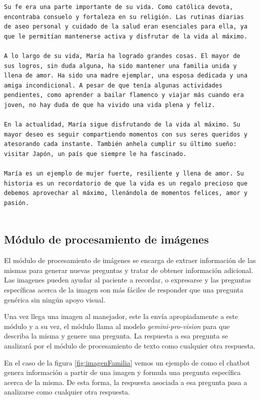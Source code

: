 \begin{verbatim}
Su fe era una parte importante de su vida. Como católica devota,  
encontraba consuelo y fortaleza en su religión. Las rutinas diarias  
de aseo personal y cuidado de la salud eran esenciales para ella, ya  
que le permitían mantenerse activa y disfrutar de la vida al máximo.  

A lo largo de su vida, María ha logrado grandes cosas. El mayor de  
sus logros, sin duda alguna, ha sido mantener una familia unida y  
llena de amor. Ha sido una madre ejemplar, una esposa dedicada y una  
amiga incondicional. A pesar de que tenía algunas actividades  
pendientes, como aprender a bailar flamenco y viajar más cuando era  
joven, no hay duda de que ha vivido una vida plena y feliz.  

En la actualidad, María sigue disfrutando de la vida al máximo. Su  
mayor deseo es seguir compartiendo momentos con sus seres queridos y  
atesorando cada instante. También anhela cumplir su último sueño:  
visitar Japón, un país que siempre le ha fascinado.  

María es un ejemplo de mujer fuerte, resiliente y llena de amor. Su  
historia es un recordatorio de que la vida es un regalo precioso que  
debemos aprovechar al máximo, llenándola de momentos felices, amor y  
pasión.
	
\end{verbatim}

\subsection{Módulo de procesamiento de imágenes}
\label{procesamientoimagenes}
El módulo de procesamiento de imágenes se encarga de extraer información de las mismas para generar nuevas preguntas y tratar de obtener información adicional. Las imagenes pueden ayudar al paciente a recordar, o expresarse y las preguntas específicas acerca de la imagen son más fáciles de responder que una pregunta genérica sin ningún apoyo visual. 

Una vez llega una imagen al manejador, este la envía apropiadamente a este módulo y a su vez, el módulo llama al modelo  \textit{gemini-pro-vision} para que describa la misma y genere una pregunta. La respuesta a esa pregunta se analizará por el módulo de procesamiento de texto como cualquier otra respuesta. 

En el caso de la figura \ref{fig:imagenFamilia} vemos un ejemplo de como el chatbot genera información a partir de una imagen y formula una pregunta específica acerca de la misma. De esta forma, la respuesta asociada a esa pregunta pasa a analizarse como cualquier otra respuesta. 

